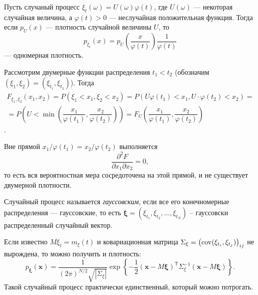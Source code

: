 \begin{ex}
  Пусть случаный процесс $\xi_t (\omega) = U(\omega)\varphi(t)$, где $ U(\omega)
  $ --- некоторая случайная величина, а $ \varphi(t) > 0 $ --- неслучайная
  положительная функция. Тогда если $p_U (x)$ --- плотность случайной величины $U$,
  то
  \[
    p_{\xi_t} (x) = p_U \left(\dfrac{x}{\varphi(t)}\right) 
    \dfrac{1}{\varphi(t)}
  \]
  ---
  одномерная плотность.

  Рассмотрим двумерные функции распределения $t_1 < t_2$
  (обозначим $(\xi_1, \xi_2) = (\xi_{t_1}, \xi_{t_2})$). Тогда
  \begin{multline*}
    F_{\xi_1, \xi_2} (x_1, x_2) = P(\xi_1 < x_1, \xi_2 < x_2)
    = P\left(U\varphi(t_1) < x_1, U\cdot\varphi(t_2) < x_2\right) = \\
    = P\left(U < \min \left(\dfrac{x_1}{\varphi(t_1)},
      \dfrac{x_2}{\varphi(t_2)}\right)\right)
    = F_U \left( \dfrac{x_1}{\varphi(t_1)}, \dfrac{x_2}{\varphi(t_2)} \right)
  \end{multline*}
  .

  Вне прямой $x_1/\varphi(t_1) = x_2/\varphi(t_2)$ выполняется
  \[
    \dfrac{\partial^2 F}{\partial x_1 \partial x_2} = 0,
  \]
  то есть вся вероятностная
  мера сосредоточена на этой прямой, и не существует двумерной плотности.
\end{ex}

\begin{definition}
  Случайный процесс называется \emph{гауссовским}, если все его конечномерные распределения
  --- гауссовские, то есть $\bm\xi = (\xi_{t_1}, \xi_{t_2}, \dots, \xi_{t_N})$ --
  гауссовски распределенный случайный вектор.
\end{definition}

Если известно $M\xi_t = m_\xi (t)$ и ковариационная матрица
$\Sigma_\xi = \left(\operatorname{cov}(\xi_{t_i}, \xi_{t_j})\right)_{ij}$ не вырождена,
то можно получить и плотность:
\[
  p_{\bm{\xi}} (\mathbf{x}) = \dfrac{1}{(2\pi)^{N/2} \sqrt{|\Sigma_\xi|}}
  \exp\left\{ -\dfrac{1}{2} (\mathbf{x} - M\bm{\xi})^{\mathsf T} \Sigma^{-1}_\xi
    (\mathbf{x} -
  M\bm{\xi}) \right\}.
\]
Такой случайный процесс практически единственный, который можно потрогать.

